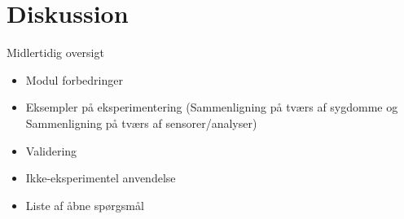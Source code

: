 \section{Diskussion}
\begin{frame}{Midlertidig oversigt}
\begin{itemize}
\item Modul forbedringer
\item Eksempler på eksperimentering (Sammenligning på tværs af sygdomme og Sammenligning på tværs af sensorer/analyser)
\item Validering
\item Ikke-eksperimentel anvendelse
\item Liste af åbne spørgsmål
\end{itemize}
\end{frame}
